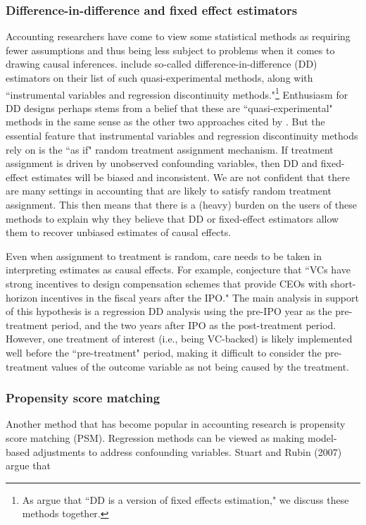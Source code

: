 \documentclass[11pt,reqno,titlepage]{amsart}
\begin{document}
\begin{doublespace}
\subsubsection{Difference-in-difference and fixed effect estimators}
Accounting researchers have come to view some statistical methods as requiring fewer assumptions and thus being less subject to problems when it comes to drawing causal inferences. 
\citet[p.\,12]{Angrist:2010jv} include so-called difference-in-difference (DD) estimators on their list of such quasi-experimental methods, along with ``instrumental variables and regression discontinuity methods."\footnote{As \citet[p.\,228]{Angrist:2008vk} argue that ``DD is a version of fixed effects estimation," we discuss these methods together.}
Enthusiasm for DD designs perhaps stems from a belief that these are ``quasi-experimental" methods in the same sense as the other two approaches cited by \citet[p.\,12]{Angrist:2010jv}.
But the essential feature that instrumental variables and regression discontinuity methods rely on is the ``as if" random treatment assignment mechanism.
If treatment assignment is driven by unobserved confounding variables, then DD and fixed-effect estimates will be biased and inconsistent. 
We are not confident that there are many settings in accounting that are likely to satisfy random treatment assignment.
This then means that there is a (heavy) burden on the users of these methods to explain why they believe that DD or fixed-effect estimators allow them to recover unbiased estimates of causal effects.

Even when assignment to treatment is random, care needs to be taken in interpreting estimates as causal effects.
For example, \citet[p.\,1305]{Cadman:2014cr} conjecture that ``VCs have strong incentives to design compensation schemes that provide CEOs with short-horizon incentives in the fiscal years after the IPO." 
The main analysis in support of this hypothesis is a regression DD analysis \citep[pp.\,233--241]{Angrist:2008vk} using the pre-IPO year as the pre-treatment period, and the two years after IPO as the post-treatment period. 
However, one treatment of interest (i.e., being VC-backed) is likely implemented well before the ``pre-treatment" period, making it difficult to consider the pre-treatment values of the outcome variable as not being caused by the treatment.

\subsubsection{Propensity score matching}
Another method that has become popular in accounting research is propensity score matching (PSM).
Regression methods can be viewed as making model-based adjustments to address confounding variables.  
Stuart and Rubin (2007) argue that 


\end{doublespace}
\end{document}
